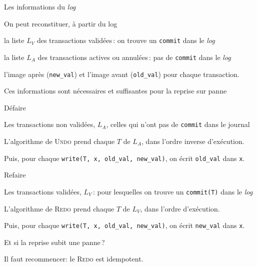 \documentclass[aspectratio=169, handout]{beamer} %
\begin{document}
\begin{frame}{Les informations du \textit{log}}

On peut reconstituer, à partir du log

\vfill

\begin{redbullet}
  \item la liste $L_V$ des transactions validées\,: on trouve un
      \texttt{commit} dans le \textit{log}
  \item la liste $L_A$ des transactions actives ou annulées\,:
      pas de \texttt{commit} dans le \textit{log}
   \item l'image après (\texttt{new\_val}) et l'image avant (\texttt{old\_val})
      pour chaque transaction.
\end{redbullet}

\vfill
\begin{blocgauche}
Ces informations sont nécessaires et suffisantes pour la reprise sur panne
\end{blocgauche}
\end{frame}

\begin{frame}{Défaire}

Les transactions non validées, $L_A$,  celles qui n'ont pas
de \texttt{commit} dans le journal

\vfill

L'algorithme de \textsc{Undo} prend chaque $T$ de $L_A$, 
\alert{dans l'ordre inverse d'exécution}.

\vfill

Puis, pour chaque \texttt{write(T, x, old\_val, new\_val)}, on écrit
\texttt{old\_val} dans \texttt{x}.

\end{frame}

\begin{frame}{Refaire}

Les transactions validées, $L_V$\,: 
pour lesquelles on trouve un \texttt{commit(T)} dans le \textit{log}

\vfill

L'algorithme de \textsc{Redo} prend chaque $T$ de $L_V$, 
\alert{dans l'ordre d'exécution}.

\vfill

Puis, pour chaque \texttt{write(T, x, old\_val, new\_val)}, on écrit
\texttt{new\_val} dans \texttt{x}.

\vfill

\begin{blocgauche}
Et si la reprise subit une panne\,?

\smallskip

 Il faut recommencer:
le \textsc{Redo} est \alert{idempotent}.
\end{blocgauche}
\end{frame}
\end{document}

